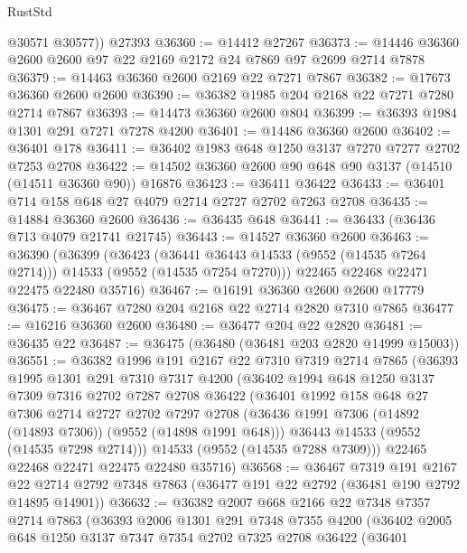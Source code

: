 \begin{lexlean}{RustStd}
\begin{coremodule}
        @30571
        @30577))
    @27393
@36360 := @14412 @27267
@36373 := @14446 @36360 @2600 @2600 @97 @22 @2169 @2172 @24 @7869 @97 @2699 @2714 @7878
@36379 := @14463 @36360 @2600 @2169 @22 @7271 @7867
@36382 := @17673 @36360 @2600 @2600
@36390 := @36382 @1985 @204 @2168 @22 @7271 @7280 @2714 @7867
@36393 := @14473 @36360 @2600 @804
@36399 := @36393 @1984 @1301 @291 @7271 @7278 @4200
@36401 := @14486 @36360 @2600
@36402 := @36401 @178
@36411 := @36402 @1983 @648 @1250 @3137 @7270 @7277 @2702 @7253 @2708
@36422 := @14502 @36360 @2600 @90 @648 @90 @3137 (@14510 (@14511 @36360 @90)) @16876
@36423 := @36411 @36422
@36433 := @36401 @714 @158 @648 @27 @4079 @2714 @2727 @2702 @7263 @2708
@36435 := @14884 @36360 @2600
@36436 := @36435 @648
@36441 := @36433 (@36436 @713 @4079 @21741 @21745)
@36443 := @14527 @36360 @2600
@36463 := @36390
    (@36399
      (@36423
        (@36441 @36443 @14533 (@9552 (@14535 @7264 @2714)))
        @14533
        (@9552 (@14535 @7254 @7270)))
      @22465
      @22468
      @22471
      @22475
      @22480
      @35716)
@36467 := @16191 @36360 @2600 @2600 @17779
@36475 := @36467 @7280 @204 @2168 @22 @2714 @2820 @7310 @7865
@36477 := @16216 @36360 @2600
@36480 := @36477 @204 @22 @2820
@36481 := @36435 @22
@36487 := @36475 (@36480 (@36481 @203 @2820 @14999 @15003))
@36551 := @36382
    @1996
    @191
    @2167
    @22
    @7310
    @7319
    @2714
    @7865
    (@36393
      @1995
      @1301
      @291
      @7310
      @7317
      @4200
      (@36402
        @1994
        @648
        @1250
        @3137
        @7309
        @7316
        @2702
        @7287
        @2708
        @36422
        (@36401
          @1992
          @158
          @648
          @27
          @7306
          @2714
          @2727
          @2702
          @7297
          @2708
          (@36436 @1991 @7306 (@14892 (@14893 @7306)) (@9552 (@14898 @1991 @648)))
          @36443
          @14533
          (@9552 (@14535 @7298 @2714)))
        @14533
        (@9552 (@14535 @7288 @7309)))
      @22465
      @22468
      @22471
      @22475
      @22480
      @35716)
@36568 := @36467
    @7319
    @191
    @2167
    @22
    @2714
    @2792
    @7348
    @7863
    (@36477 @191 @22 @2792 (@36481 @190 @2792 @14895 @14901))
@36632 := @36382
    @2007
    @668
    @2166
    @22
    @7348
    @7357
    @2714
    @7863
    (@36393
      @2006
      @1301
      @291
      @7348
      @7355
      @4200
      (@36402
        @2005
        @648
        @1250
        @3137
        @7347
        @7354
        @2702
        @7325
        @2708
        @36422
        (@36401

\end{coremodule}
\end{lexlean}
